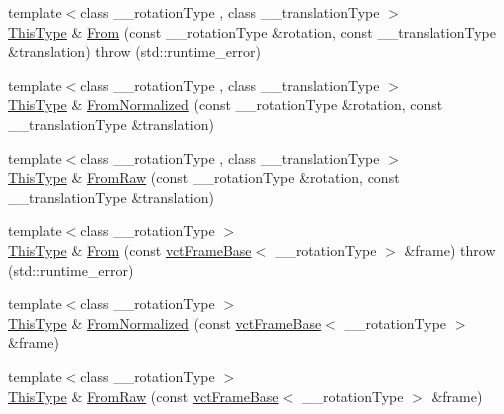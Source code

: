 {\bf }\par
\begin{DoxyCompactItemize}
\item 
{\footnotesize template$<$class \-\_\-\-\_\-rotation\-Type , class \-\_\-\-\_\-translation\-Type $>$ }\\\hyperlink{classvct_frame4x4_base_af6dcf167c0c3965872a095ce28853598}{This\-Type} \& \hyperlink{classvct_frame4x4_base_a32f3d44040d2896b4375a0b39368e9e7}{From} (const \-\_\-\-\_\-rotation\-Type \&rotation, const \-\_\-\-\_\-translation\-Type \&translation)  throw (std\-::runtime\-\_\-error)
\item 
{\footnotesize template$<$class \-\_\-\-\_\-rotation\-Type , class \-\_\-\-\_\-translation\-Type $>$ }\\\hyperlink{classvct_frame4x4_base_af6dcf167c0c3965872a095ce28853598}{This\-Type} \& \hyperlink{classvct_frame4x4_base_ac11a884f5cdb103b8fedda081156d1fd}{From\-Normalized} (const \-\_\-\-\_\-rotation\-Type \&rotation, const \-\_\-\-\_\-translation\-Type \&translation)
\item 
{\footnotesize template$<$class \-\_\-\-\_\-rotation\-Type , class \-\_\-\-\_\-translation\-Type $>$ }\\\hyperlink{classvct_frame4x4_base_af6dcf167c0c3965872a095ce28853598}{This\-Type} \& \hyperlink{classvct_frame4x4_base_a9459943051064e7721f9f22c698bdc48}{From\-Raw} (const \-\_\-\-\_\-rotation\-Type \&rotation, const \-\_\-\-\_\-translation\-Type \&translation)
\end{DoxyCompactItemize}

{\bf }\par
\begin{DoxyCompactItemize}
\item 
{\footnotesize template$<$class \-\_\-\-\_\-rotation\-Type $>$ }\\\hyperlink{classvct_frame4x4_base_af6dcf167c0c3965872a095ce28853598}{This\-Type} \& \hyperlink{classvct_frame4x4_base_ab65f11ae8f5d873aa6d0d1abf304dcba}{From} (const \hyperlink{classvct_frame_base}{vct\-Frame\-Base}$<$ \-\_\-\-\_\-rotation\-Type $>$ \&frame)  throw (std\-::runtime\-\_\-error)
\item 
{\footnotesize template$<$class \-\_\-\-\_\-rotation\-Type $>$ }\\\hyperlink{classvct_frame4x4_base_af6dcf167c0c3965872a095ce28853598}{This\-Type} \& \hyperlink{classvct_frame4x4_base_a93d12c3df23da1f9f5798e8146cc187a}{From\-Normalized} (const \hyperlink{classvct_frame_base}{vct\-Frame\-Base}$<$ \-\_\-\-\_\-rotation\-Type $>$ \&frame)
\item 
{\footnotesize template$<$class \-\_\-\-\_\-rotation\-Type $>$ }\\\hyperlink{classvct_frame4x4_base_af6dcf167c0c3965872a095ce28853598}{This\-Type} \& \hyperlink{classvct_frame4x4_base_a5ef2f82d1a0ac32c648e519e465dcd3d}{From\-Raw} (const \hyperlink{classvct_frame_base}{vct\-Frame\-Base}$<$ \-\_\-\-\_\-rotation\-Type $>$ \&frame)
\end{DoxyCompactItemize}

